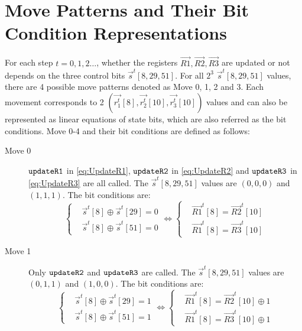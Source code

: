 \section{Move Patterns and Their Bit Condition Representations}\label{sec:MovePatternAndBC}
For each step $t=0,1,2\ldots$, whether the registers $\vec{R1},\vec{R2},\vec{R3}$ are updated or not depends on the three control bits $\vec{s}^t[8,29,51]$. %
For all $2^3$ $\vec{s}^t[8,29,51]$ values, there are 4 possible move patterns denoted as Move 0, 1, 2 and 3.
Each movement corresponds to 2 $(\vec{r_1^t}[8],\vec{r_2^t}[10],\vec{r_3^t}[10])$ values and can also be represented as linear equations of state bits, which are also referred as the bit conditions.
Move 0-4 and their bit conditions are defined as follows:
\begin{description}
  \item[Move 0] $\tt{updateR1}$ in \eqref{eq:UpdateR1}, $\tt{updateR2}$ in \eqref{eq:UpdateR2} and $\tt{updateR3}$ in \eqref{eq:UpdateR3} are all called.
  The $\vec{s}^t[8,29,51]$ values are $(0,0,0)$ and $(1,1,1)$.
  The bit conditions are:
  \begin{equation}\label{eq:Move0BitCondition}
        \left\{
    \begin{aligned}
    &\vec{s}^t[8]\oplus \vec{s}^t[29]=0\\
    &\vec{s}^t[8]\oplus \vec{s}^t[51]=0
    \end{aligned}
    \right.
    \Leftrightarrow
    \left\{
    \begin{aligned}
    &\vec{R1}^t[8]=\vec{R2}^t[10]\\
    &\vec{R1}^t[8]=\vec{R3}^t[10]
    \end{aligned}
    \right.
  \end{equation}
  \item[Move 1] Only $\tt{updateR2}$ and $\tt{updateR3}$ are called.
  The $\vec{s}^t[8,29,51]$ values are $(0,1,1)$ and $(1,0,0)$.
  The bit conditions are:
  \begin{equation}\label{eq:Move1BitCondition}
    \left\{
    \begin{aligned}
    &\vec{s}^t[8] \oplus \vec{s}^t[29]=1\\
    &\vec{s}^t[8] \oplus \vec{s}^t[51]=1
    \end{aligned}
    \right.
    \Leftrightarrow
    \left\{
    \begin{aligned}
    &\vec{R1}^t[8]=\vec{R2}^t[10]\oplus 1\\
    &\vec{R1}^t[8]=\vec{R3}^t[10]\oplus 1

\end{aligned}
\end{equation}
\end{description}
